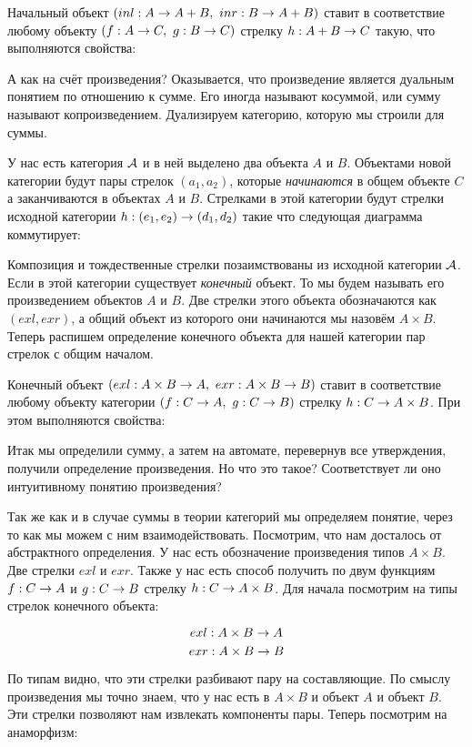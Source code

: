 Начальный объект $(inl : A \rightarrow A+B,\ inr : B \rightarrow A+B)$ ставит 
в соответствие любому объекту $(f : A \rightarrow C,\ g : B \rightarrow C)$ 
стрелку $h : A+B \rightarrow C$ такую, что выполняются свойства:


А как на счёт произведения? Оказывается, что произведение
является дуальным понятием по отношению к сумме. Его иногда
называют косуммой, или сумму называют копроизведением. 
Дуализируем категорию, которую мы строили для суммы.

У нас есть категория $\mathcal{A}$ и в ней выделено два объекта
$A$ и $B$. Объектами новой категории будут пары стрелок $(a_1,a_2)$,
которые \emph{начинаются} в общем объекте $C$ а заканчиваются
в объектах $A$ и $B$. Стрелками в этой категории будут
стрелки исходной категории $h : (e_1,e_2) \rightarrow (d_1,d_2)$ такие что следующая
диаграмма коммутирует:


Композиция и тождественные стрелки позаимствованы
из исходной категории $\mathcal{A}$. Если в этой категории
существует \emph{конечный} объект. То мы будем
называть его произведением объектов $A$ и $B$.
Две стрелки этого объекта обозначаются как $(exl,exr)$,
а общий объект из которого они начинаются мы назовём
$A\times B$. Теперь распишем определение конечного объекта
для нашей категории пар стрелок с общим началом.


Конечный объект $(exl : A \times B \Ra A, \ exr : A \times B \Ra B)$ 
ставит в соответствие любому объекту категории
$(f : C \rightarrow A,\ g : C \rightarrow B)$ стрелку $h : C \rightarrow A \times B$.
При этом выполняются свойства:


Итак мы определили сумму, а затем на автомате, перевернув
все утверждения, получили определение произведения. 
Но что это такое? Соответствует ли оно интуитивному
понятию произведения? 

Так же как и в случае суммы в теории категорий мы 
определяем понятие, через то как мы можем с ним 
взаимодействовать. Посмотрим, что нам досталось от 
абстрактного определения. У нас есть обозначение произведения
типов $A \times B$. Две стрелки $exl$ и $exr$. Также у нас есть
способ получить по двум функциям $f : C \rightarrow A$ и $g : C \rightarrow B$
стрелку $h : C \rightarrow A \times B$. Для начала посмотрим на типы стрелок 
конечного объекта:

\[ exl : A \times B \rightarrow A \]
\[ exr : A \times B \rightarrow B \]

По типам видно, что эти стрелки разбивают пару на составляющие.
По смыслу произведения мы точно знаем, что у нас есть в $A\times B$ 
и объект $A$ и объект $B$. Эти стрелки позволяют нам извлекать 
компоненты пары. Теперь посмотрим на анаморфизм:

